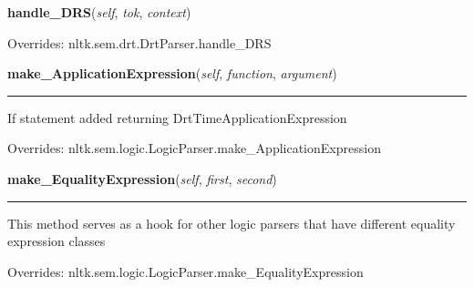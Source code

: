     \vspace{0.5ex}

\hspace{.8\funcindent}\begin{boxedminipage}{\funcwidth}

    \raggedright \textbf{handle\_DRS}(\textit{self}, \textit{tok}, \textit{context})

\setlength{\parskip}{2ex}
\setlength{\parskip}{1ex}
      Overrides: nltk.sem.drt.DrtParser.handle\_DRS

    \end{boxedminipage}

    \vspace{0.5ex}

\hspace{.8\funcindent}\begin{boxedminipage}{\funcwidth}

    \raggedright \textbf{make\_ApplicationExpression}(\textit{self}, \textit{function}, \textit{argument})

    \vspace{-1.5ex}

    \rule{\textwidth}{0.5\fboxrule}
\setlength{\parskip}{2ex}
    If statement added returning DrtTimeApplicationExpression

\setlength{\parskip}{1ex}
      Overrides: nltk.sem.logic.LogicParser.make\_ApplicationExpression

    \end{boxedminipage}

    \vspace{0.5ex}

\hspace{.8\funcindent}\begin{boxedminipage}{\funcwidth}

    \raggedright \textbf{make\_EqualityExpression}(\textit{self}, \textit{first}, \textit{second})

    \vspace{-1.5ex}

    \rule{\textwidth}{0.5\fboxrule}
\setlength{\parskip}{2ex}
    This method serves as a hook for other logic parsers that have 
    different equality expression classes

\setlength{\parskip}{1ex}
      Overrides: nltk.sem.logic.LogicParser.make\_EqualityExpression

    \end{boxedminipage}

    \vspace{0.5ex}

